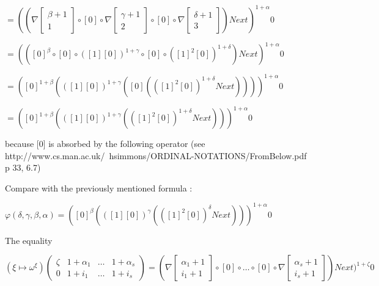 \documentclass[10pt]{article}
\begin{document}
\( = ((\nabla \begin{bmatrix} \beta+1 \\
                              1       \end{bmatrix} \circ [0] \circ \nabla \begin{bmatrix} \gamma+1 \\
                                                                                           2        \end{bmatrix} \circ [0] \circ \nabla \begin{bmatrix} \delta+1 \\
                                                                                                                                                         3        \end{bmatrix}) Next)^{1+\alpha} 0 \)

\( = (([0]^\beta \circ [0] \circ ([1] [0])^{1+\gamma} \circ [0] \circ ([1]^2 [0])^{1+\delta}) Next)^{1+\alpha} 0 \)

\( = ([0]^{1+\beta} (([1] [0])^{1+\gamma} ([0] (([1]^2 [0])^{1+\delta} Next))))^{1+\alpha} 0 \)

\( = ([0]^{1+\beta} (([1] [0])^{1+\gamma} (([1]^2 [0])^{1+\delta} Next)))^{1+\alpha} 0 \) 

because [0] is absorbed by the following operator (see http://www.cs.man.ac.uk/~hsimmons/ORDINAL-NOTATIONS/FromBelow.pdf p 33, 6.7)

Compare with the previously mentioned formula :

\( \varphi(\delta,\gamma,\beta,\alpha) = ([0]^\beta (([1] [0])^\gamma (([1]^2 [0])^\delta Next)))^{1+\alpha} 0 \)

\bigskip

The equality

\( (\xi \mapsto \omega^\xi) \begin{pmatrix} \zeta & 1+\alpha_1 & \ldots & 1+\alpha_s \\
                                            0     & 1+i_1      & \ldots & 1+i_s      \end{pmatrix} 
 = (\nabla \begin{bmatrix} \alpha_1+1 \\
                             i_1+1      \end{bmatrix} \circ [0] \circ \ldots \circ [0] \circ \nabla \begin{bmatrix} \alpha_s+1 \\
                                                                                                                    i_s+1      \end{bmatrix}) Next)^{1+\zeta} 0 \)
\end{document}
